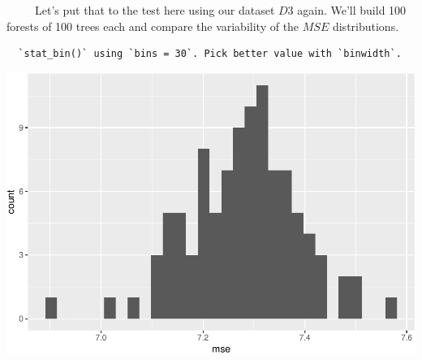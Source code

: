 \documentclass[12pt,twoside]{reedthesis}
\begin{document}
  ~~~~~Let's put that to the test here using our dataset \(D3\) again.
  We'll build 100 forests of 100 trees each and compare the variability of
  the \(MSE\) distributions.
  
  \begin{Shaded}
  \begin{Highlighting}[]
  
  \StringTok{ }\NormalTok{(}\NormalTok{,}\NormalTok{)}
  \StringTok{ }\NormalTok{(}\NormalTok{,}\NormalTok{)}
  \NormalTok{:}\NormalTok{)\{}
    \StringTok{ }   \NormalTok{)}
    \StringTok{ }\StringTok{ }\NormalTok{)}
  \NormalTok{\}}
  
  \StringTok{ }
  
  \NormalTok{(}\NormalTok{(}  \StringTok{ }\NormalTok{()}
  \end{Highlighting}
  \end{Shaded}
  
  \begin{verbatim}
  `stat_bin()` using `bins = 30`. Pick better value with `binwidth`.
  \end{verbatim}
  
  \begin{center}\includegraphics{Thesis_files/figure-latex/unnamed-chunk-3-1} \end{center}
  
\end{document}
